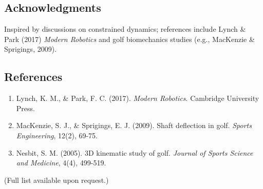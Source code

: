 \documentclass[11pt]{article}
\begin{document}
\subsection{Acknowledgments}
Inspired by discussions on constrained dynamics; references include Lynch \& Park (2017) \textit{Modern Robotics} and golf biomechanics studies (e.g., MacKenzie \& Sprigings, 2009).

\subsection{References}
\begin{enumerate}
    \item Lynch, K. M., \& Park, F. C. (2017). \textit{Modern Robotics}. Cambridge University Press.
    \item MacKenzie, S. J., \& Sprigings, E. J. (2009). Shaft deflection in golf. \textit{Sports Engineering}, 12(2), 69-75.
    \item Nesbit, S. M. (2005). 3D kinematic study of golf. \textit{Journal of Sports Science and Medicine}, 4(4), 499-519.
\end{enumerate}
(Full list available upon request.)
\end{document}
